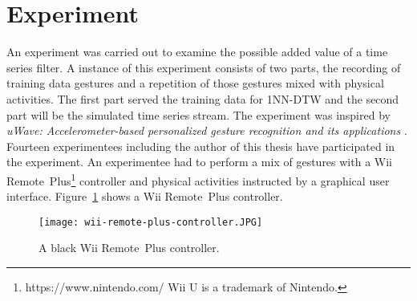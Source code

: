 \section{Experiment} \label{experiment}
An experiment was carried out to examine the possible added value of a time series filter. A instance of this experiment
consists of two parts, the recording of training data gestures and a repetition of those gestures mixed with physical
activities. The first part served the training data for 1NN-DTW and the second part will be the simulated time series
stream. The experiment was inspired by
\textit{uWave: Accelerometer-based personalized gesture recognition and its applications} \cite{liu2009uwave}. Fourteen
experimentees including the author of this thesis have participated in the experiment. An experimentee had to perform a
mix of gestures with a Wii
Remote\texttrademark~Plus\footnote{https://www.nintendo.com/ Wii U is a trademark of Nintendo.} controller and physical
activities instructed by a graphical user interface. Figure~\ref{fig:wii-remote} shows a Wii Remote\texttrademark~Plus
controller.
\begin{figure}
    \begin{center}
        \texttt{[image: wii-remote-plus-controller.JPG]}
    \end{center}
    \caption{A black Wii Remote\texttrademark~Plus controller.}
    \label{fig:wii-remote}
\end{figure}




